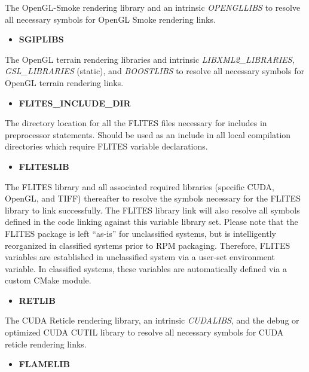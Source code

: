 \documentclass[12pt,letterpaper]{article}
\begin{document}
The OpenGL-Smoke rendering library and an intrinsic \emph{OPENGLLIBS} to resolve all necessary symbols for OpenGL Smoke rendering links.

\begin{itemize}
\item \textbf{SGIPLIBS}
\end{itemize}

The OpenGL terrain rendering libraries and intrinsic \emph{LIBXML2\_LIBRARIES}, \emph{GSL\_LIBRARIES} (static), and \emph{BOOSTLIBS} to resolve all necessary symbols for OpenGL terrain rendering links.

\begin{itemize}
\item \textbf{FLITES\_INCLUDE\_DIR}
\end{itemize}

The directory location for all the FLITES files necessary for includes in preprocessor statements.  Should be used as an include in all local compilation directories which require FLITES variable declarations.

\begin{itemize}
\item \textbf{FLITESLIB}
\end{itemize}

The FLITES library and all associated required libraries (specific CUDA, OpenGL, and TIFF) thereafter to resolve the symbols necessary for the FLITES library to link successfully.  The FLITES library link will also resolve all symbols defined in the code linking against this variable library set.  Please note that the FLITES package is left ``as-is'' for unclassified systems, but is intelligently reorganized in classified systems prior to RPM packaging.  Therefore, FLITES variables are established in unclassified system via a user-set environment variable.  In classified systems, these variables are automatically defined via a custom CMake module.

\begin{itemize}
\item \textbf{RETLIB}
\end{itemize}

The CUDA Reticle rendering library, an intrinsic \emph{CUDALIBS}, and the debug or optimized CUDA CUTIL library to resolve all necessary symbols for CUDA reticle rendering links.

\begin{itemize}
\item \textbf{FLAMELIB}
\end{itemize}
\end{document}
